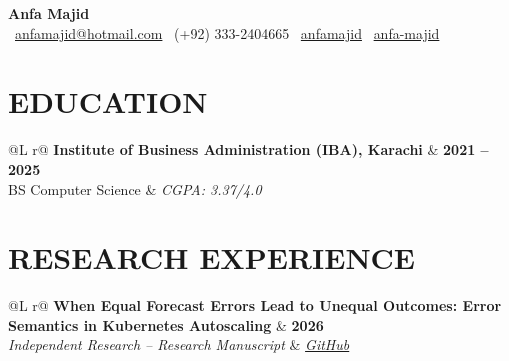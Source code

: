 \documentclass[a4paper,9pt]{article}
\begin{document}

\begin{center}
    {\Huge \textbf{Anfa Majid}}\\[5pt]

    \faEnvelope\ 
    \href{mailto:anfamajid@hotmail.com}{anfamajid@hotmail.com}
    \quad
    \faMobile\ (+92) 333-2404665
    \quad
    \faLinkedin\ \href{https://www.linkedin.com/in/anfamajid}{anfamajid}
    \quad
    \faGithub\ \href{https://github.com/anfa-majid}{anfa-majid}
\end{center}


\section{EDUCATION}

\begin{tabularx}{\linewidth}{@{}L r@{}}
\textbf{Institute of Business Administration (IBA), Karachi}
& \textbf{2021 -- 2025} \\

BS Computer Science
& \textit{CGPA: 3.37/4.0}
\end{tabularx}


\section{RESEARCH EXPERIENCE}

\begin{tabularx}{\linewidth}{@{}L r@{}} \textbf{When Equal Forecast Errors Lead to Unequal Outcomes: Error Semantics in Kubernetes Autoscaling} & \textbf{2026} \\ \textit{Independent Research -- Research Manuscript} & \href{https://github.com/anfa-majid/forecast-error-semantics-kubernetes-autoscaling}{\textit{GitHub}} \\[-2pt] \end{tabularx}
\end{document}

